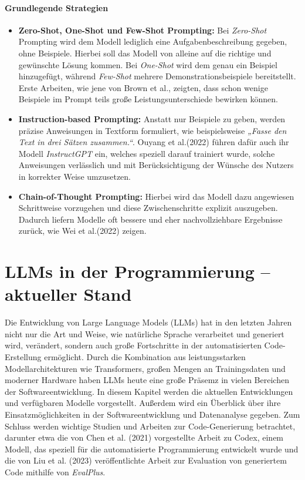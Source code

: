 \documentclass[11pt,a4paper]{article}
\begin{document}
\paragraph{Grundlegende Strategien}
\begin{itemize}
  \item \textbf{Zero-Shot, One-Shot und Few-Shot Prompting:}  
  Bei \emph{Zero-Shot} Prompting wird dem Modell lediglich eine Aufgabenbeschreibung gegeben, ohne Beispiele. Hierbei soll das Modell von alleine auf die richtige und gewünschte Lösung kommen. Bei \emph{One-Shot} wird dem genau ein Beispiel hinzugefügt, während \emph{Few-Shot} mehrere Demonstrationsbeispiele bereitstellt. Erste Arbeiten, wie jene von Brown et al.\cite{brown2020languagemodelsfewshotlearners}, zeigten, dass schon wenige Beispiele im Prompt teils große Leistungsunterschiede bewirken können.

  \item \textbf{Instruction-based Prompting:}  
  Anstatt nur Beispiele zu geben, werden präzise Anweisungen in Textform formuliert, wie beispielsweise \emph{„Fasse den Text in drei Sätzen zusammen.“}. Ouyang et al.(2022) führen dafür auch ihr Modell \emph{InstructGPT} ein, welches speziell darauf trainiert wurde, solche Anweisungen verlässlich und mit Berücksichtigung der Wünsche des Nutzers in korrekter Weise umzusetzen\cite{ouyang2022traininglanguagemodelsfollow}.

  \item \textbf{Chain-of-Thought Prompting:}  
  Hierbei wird das Modell dazu angewiesen Schrittweise vorzugehen und diese Zwischenschritte explizit auszugeben. Dadurch liefern Modelle oft bessere und eher nachvollziehbare Ergebnisse zurück, wie Wei et al.(2022) zeigen\cite{wei2023chainofthoughtpromptingelicitsreasoning}.
\end{itemize}


\section{LLMs in der Programmierung – aktueller Stand}
\label{sec:llms_programmierung}
Die Entwicklung von Large Language Models (LLMs) hat in den letzten Jahren nicht nur die Art und Weise, wie natürliche Sprache verarbeitet und generiert wird, verändert, sondern auch große Fortschritte in der automatisierten Code-Erstellung ermöglicht. Durch die Kombination aus leistungsstarken Modellarchitekturen wie Transformers, großen Mengen an Trainingsdaten und moderner Hardware haben LLMs heute eine große Präsemz in vielen Bereichen der Softwareentwicklung.
In diesem Kapitel werden die aktuellen Entwicklungen und verfügbaren Modelle vorgestellt. Außerdem wird ein Überblick über ihre Einsatzmöglichkeiten in der Softwareentwicklung und Datenanalyse gegeben. Zum Schluss werden wichtige Studien und Arbeiten zur Code-Generierung betrachtet, darunter etwa die von Chen et al. (2021) vorgestellte Arbeit zu Codex, einem Modell, das speziell für die automatisierte Programmierung entwickelt wurde\cite{chen2021evaluatinglargelanguagemodels} und die von Liu et al. (2023) veröffentlichte Arbeit zur Evaluation von generiertem Code mithilfe von \emph{EvalPlus}\cite{NEURIPS2023_43e9d647}.
\end{document}
